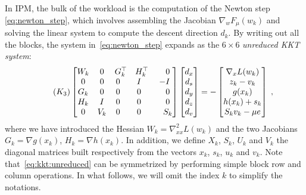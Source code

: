 In IPM, the bulk of the workload is the computation of the Newton
step \eqref{eq:newton_step}, which involves assembling the Jacobian
$\nabla_w F_\mu(w_k)$ and solving the linear system to compute
the descent direction $d_k$.
By writing out all the blocks, the system in~\eqref{eq:newton_step} expands as the $6 \times 6$
\emph{unreduced KKT system}:
\begin{equation}
  \label{eq:kkt:unreduced}
  \setlength\arraycolsep{5pt}
  \tag{$K_3$}
  \begin{bmatrix}
    W_k & 0   & G_k^\top         & H_k^\top         & \phantom{-}0 \\
    0   & 0   & 0\phantom{^\top} & I\phantom{^\top} & -I           \\
    G_k & 0   & 0\phantom{^\top} & 0\phantom{^\top} & \phantom{-}0 \\
    H_k & I   & 0\phantom{^\top} & 0\phantom{^\top} & \phantom{-}0 \\
    0   & V_k & 0\phantom{^\top} & 0\phantom{^\top} & \phantom{-}S_k
  \end{bmatrix}
  \begin{bmatrix}
    d_x \\
    d_s \\
    d_y \\
    d_z \\
    d_v
  \end{bmatrix}
  = - \begin{bmatrix}
    \nabla_x L(w_k) \\
       z_k - v_k  \\
       g(x_k)  \\
       h(x_k) + s_k  \\
       S_k v_k - \mu e
  \end{bmatrix} \; ,
\end{equation}
where we have introduced the Hessian $W_k = \nabla^2_{x x} L(w_k)$ and
the two Jacobians $G_k = \nabla g(x_k)$, $H_k = \nabla h(x_k)$.
In addition, we define $X_k$, $S_k$, $U_k$ and $V_k$ the diagonal matrices built respectively
from the vectors $x_k$, $s_k$, $u_k$ and $v_k$.
Note that~\eqref{eq:kkt:unreduced} can be symmetrized by performing simple block row and column operations.
In what follows, we will omit the index $k$ to simplify the notations.

